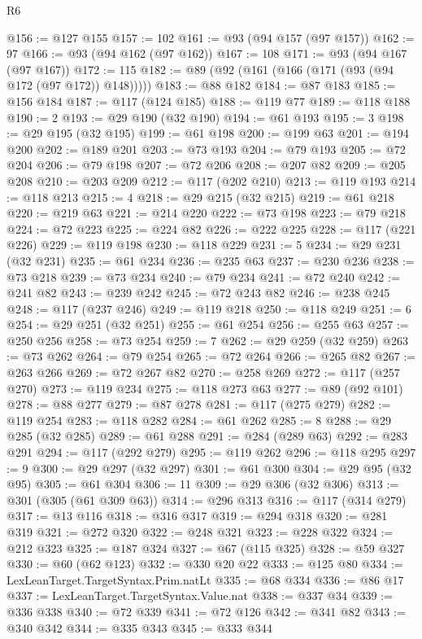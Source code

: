 \begin{lexlean}{R6}
\begin{coremodule}
@156 := @127 @155
@157 := 102
@161 := @93 (@94 @157 (@97 @157))
@162 := 97
@166 := @93 (@94 @162 (@97 @162))
@167 := 108
@171 := @93 (@94 @167 (@97 @167))
@172 := 115
@182 := @89 (@92 (@161 (@166 (@171 (@93 (@94 @172 (@97 @172)) @148)))))
@183 := @88 @182
@184 := @87 @183
@185 := @156 @184
@187 := @117 (@124 @185)
@188 := @119 @77
@189 := @118 @188
@190 := 2
@193 := @29 @190 (@32 @190)
@194 := @61 @193
@195 := 3
@198 := @29 @195 (@32 @195)
@199 := @61 @198
@200 := @199 @63
@201 := @194 @200
@202 := @189 @201
@203 := @73 @193
@204 := @79 @193
@205 := @72 @204
@206 := @79 @198
@207 := @72 @206
@208 := @207 @82
@209 := @205 @208
@210 := @203 @209
@212 := @117 (@202 @210)
@213 := @119 @193
@214 := @118 @213
@215 := 4
@218 := @29 @215 (@32 @215)
@219 := @61 @218
@220 := @219 @63
@221 := @214 @220
@222 := @73 @198
@223 := @79 @218
@224 := @72 @223
@225 := @224 @82
@226 := @222 @225
@228 := @117 (@221 @226)
@229 := @119 @198
@230 := @118 @229
@231 := 5
@234 := @29 @231 (@32 @231)
@235 := @61 @234
@236 := @235 @63
@237 := @230 @236
@238 := @73 @218
@239 := @73 @234
@240 := @79 @234
@241 := @72 @240
@242 := @241 @82
@243 := @239 @242
@245 := @72 @243 @82
@246 := @238 @245
@248 := @117 (@237 @246)
@249 := @119 @218
@250 := @118 @249
@251 := 6
@254 := @29 @251 (@32 @251)
@255 := @61 @254
@256 := @255 @63
@257 := @250 @256
@258 := @73 @254
@259 := 7
@262 := @29 @259 (@32 @259)
@263 := @73 @262
@264 := @79 @254
@265 := @72 @264
@266 := @265 @82
@267 := @263 @266
@269 := @72 @267 @82
@270 := @258 @269
@272 := @117 (@257 @270)
@273 := @119 @234
@275 := @118 @273 @63
@277 := @89 (@92 @101)
@278 := @88 @277
@279 := @87 @278
@281 := @117 (@275 @279)
@282 := @119 @254
@283 := @118 @282
@284 := @61 @262
@285 := 8
@288 := @29 @285 (@32 @285)
@289 := @61 @288
@291 := @284 (@289 @63)
@292 := @283 @291
@294 := @117 (@292 @279)
@295 := @119 @262
@296 := @118 @295
@297 := 9
@300 := @29 @297 (@32 @297)
@301 := @61 @300
@304 := @29 @95 (@32 @95)
@305 := @61 @304
@306 := 11
@309 := @29 @306 (@32 @306)
@313 := @301 (@305 (@61 @309 @63))
@314 := @296 @313
@316 := @117 (@314 @279)
@317 := @13 @116
@318 := @316 @317
@319 := @294 @318
@320 := @281 @319
@321 := @272 @320
@322 := @248 @321
@323 := @228 @322
@324 := @212 @323
@325 := @187 @324
@327 := @67 (@115 @325)
@328 := @59 @327
@330 := @60 (@62 @123)
@332 := @330 @20 @22
@333 := @125 @80
@334 := LexLeanTarget.TargetSyntax.Prim.natLt
@335 := @68 @334
@336 := @86 @17
@337 := LexLeanTarget.TargetSyntax.Value.nat
@338 := @337 @34
@339 := @336 @338
@340 := @72 @339
@341 := @72 @126
@342 := @341 @82
@343 := @340 @342
@344 := @335 @343
@345 := @333 @344

\end{coremodule}
\end{lexlean}
